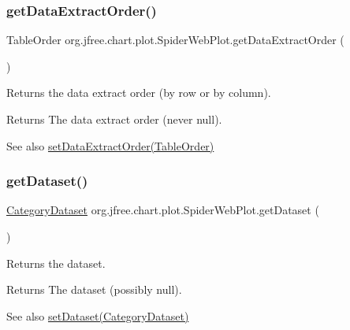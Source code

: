 \subsubsection{\texorpdfstring{get\+Data\+Extract\+Order()}{getDataExtractOrder()}}
{\footnotesize\ttfamily Table\+Order org.\+jfree.\+chart.\+plot.\+Spider\+Web\+Plot.\+get\+Data\+Extract\+Order (\begin{DoxyParamCaption}{ }\end{DoxyParamCaption})}

Returns the data extract order (by row or by column).

\begin{DoxyReturn}{Returns}
The data extract order (never {\ttfamily null}).
\end{DoxyReturn}
\begin{DoxySeeAlso}{See also}
\mbox{\hyperlink{classorg_1_1jfree_1_1chart_1_1plot_1_1_spider_web_plot_a44453e46effe569cfbfd96c3a0667a3d}{set\+Data\+Extract\+Order(\+Table\+Order)}} 
\end{DoxySeeAlso}
\mbox{\label{classorg_1_1jfree_1_1chart_1_1plot_1_1_spider_web_plot_ad7f61479dddf8cce633d3192d37e732e}} 
\subsubsection{\texorpdfstring{get\+Dataset()}{getDataset()}}
{\footnotesize\ttfamily \mbox{\hyperlink{interfaceorg_1_1jfree_1_1data_1_1category_1_1_category_dataset}{Category\+Dataset}} org.\+jfree.\+chart.\+plot.\+Spider\+Web\+Plot.\+get\+Dataset (\begin{DoxyParamCaption}{ }\end{DoxyParamCaption})}

Returns the dataset.

\begin{DoxyReturn}{Returns}
The dataset (possibly {\ttfamily null}).
\end{DoxyReturn}
\begin{DoxySeeAlso}{See also}
\mbox{\hyperlink{classorg_1_1jfree_1_1chart_1_1plot_1_1_spider_web_plot_a23333c2d4229d0ab0d4cf3671b661e0a}{set\+Dataset(\+Category\+Dataset)}} 
\end{DoxySeeAlso}
\mbox{\label{classorg_1_1jfree_1_1chart_1_1plot_1_1_spider_web_plot_ac4d6cdf78a5f822b4f2a0a8ccca8a3f4}} 
